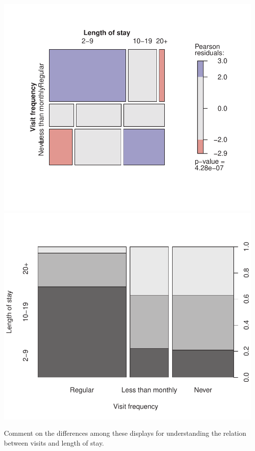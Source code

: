 \documentclass[10pt]{report}\usepackage[]{graphicx}\usepackage[]{color}
\newenvironment{knitrout}{}{} %
\renewenvironment{knitrout}{\small\renewcommand{\baselinestretch}{.85}}{} %
\begin{document}
\begin{Exercises}
\begin{enumerate*}
\begin{ans}
\begin{knitrout}
\centerline{\includegraphics[width=.5\textwidth]{soln/fig/ex4_5a2-1} 
\includegraphics[width=.5\textwidth]{soln/fig/ex4_5a2-2} }



\end{knitrout}
      \end{ans}
      
      \item Comment on the differences among these displays for understanding the relation between 
      visits and length of stay.
      \begin{ans}
      \end{ans}
      
    \end{enumerate*}
  

\end{Exercises}
\end{document}
